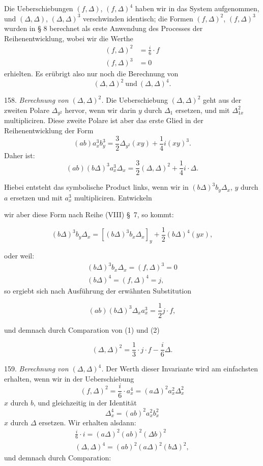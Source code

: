\documentclass[11pt]{article}
\providecommand{\weberpage}[1]{}
\providecommand{\weq}[2]{\begin{equation}\tag{#1}#2\end{equation}}
\let\Delta\varDelta
\begin{document}
Die Ueberschiebungen $(f,\Delta)$, $(f,\Delta)^4$ haben wir in das System aufgenommen, und $(\Delta,\Delta)$, $(\Delta,\Delta)^3$ verschwinden identisch; die Formen $(f,\Delta)^2$, $(f,\Delta)^3$ wurden in § 8 berechnet als erste Anwendung des Processes der Reihenentwicklung, wobei wir die Werthe
\[
\begin{aligned}
(f,\Delta)^2&=\frac{i}{6}\cdot f\\
(f,\Delta)^3&=0
\end{aligned}
\]
erhielten. Es erübrigt also nur noch die Berechnung von
\[
(\Delta,\Delta)^2\ \text{und}\ (\Delta,\Delta)^4.
\]

158. \textit{Berechnung von $(\Delta,\Delta)^2$.} Die Ueberschiebung $(\Delta,\Delta)^2$ geht aus der zweiten Polare $\Delta_{y^2}$ hervor, wenn wir darin $y$ durch $\Delta_1$ ersetzen, und mit $\Delta_{1x}^2$ multipliciren. Diese zweite Polare ist aber das erste Glied in der Reihenentwicklung der Form
\[
(ab)a_x^3b_y^3=\frac{3}{2}\Delta_{y^2}(xy)+\frac{1}{4}i(xy)^3.
\]
Daher ist:
\weq{1}{(ab)(b\Delta)^3a_x^3\Delta_x=\frac{3}{2}(\Delta,\Delta)^2+\frac{1}{4}i\cdot\Delta.}

Hiebei entsteht das symbolische Product links, wenn wir in $(b\Delta)^3b_y\Delta_x$, $y$ durch $a$ ersetzen und mit $a_x^3$ multipliciren. Entwickeln


\weberpage{181}

wir aber diese Form nach Reihe (VIII) \S~7, so kommt:

\weq{1}{(b\Delta)^3 b_y \Delta_x = [(b\Delta)^3 b_x \Delta_x]_y + \frac{1}{2}(b\Delta)^4(yx),}

oder weil:
\[
\begin{gathered}
(b\Delta)^3 b_x \Delta_x = (f,\Delta)^3 = 0 \\
(b\Delta)^4 = (f,\Delta)^4 = j,
\end{gathered}
\]
so ergiebt sich nach Ausführung der erwähnten Substitution

\weq{2}{(ab)(b\Delta)^3 \Delta_x a_x^3 = \frac{1}{2} j\cdot f,}

und demnach durch Comparation von (1) und (2)

\weq{3}{(\Delta,\Delta)^2 = \frac{1}{3}\cdot j\cdot f - \frac{i}{6}\Delta.}

159. \textit{Berechnung von $(\Delta,\Delta)^4$.} Der Werth dieser Invariante wird am einfachsten erhalten, wenn wir in der Ueberschiebung
\[
(f,\Delta)^2 = \frac{i}{6}\cdot a_x^4 = (a\Delta)^2 a_x^2 \Delta_x^2
\]
$x$ durch $b$, und gleichzeitig in der Identität
\[
\Delta_x^4 = (ab)^2 a_x^2 b_x^2
\]
$x$ durch $\Delta$ ersetzen. Wir erhalten alsdann:
\[
\begin{gathered}
\frac{i}{6}\cdot i = (a\Delta)^2(ab)^2(\Delta b)^2 \\
(\Delta,\Delta)^4 = (ab)^2(a\Delta)^2(b\Delta)^2,
\end{gathered}
\]
und demnach durch Comparation:
\end{document}
